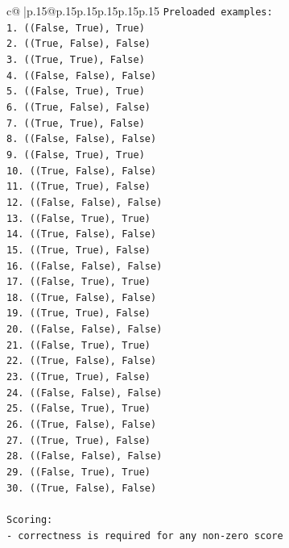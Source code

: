 \documentclass{article}
\begin{document}
{\begin{supertabular}{c@{$\;$}|p{.15\linewidth}@{}p{.15\linewidth}p{.15\linewidth}p{.15\linewidth}p{.15\linewidth}p{.15\linewidth}}
{{{\texttt{Preloaded examples:} \\
\texttt{1. ((False, True), True)} \\
\texttt{2. ((True, False), False)} \\
\texttt{3. ((True, True), False)} \\
\texttt{4. ((False, False), False)} \\
\texttt{5. ((False, True), True)} \\
\texttt{6. ((True, False), False)} \\
\texttt{7. ((True, True), False)} \\
\texttt{8. ((False, False), False)} \\
\texttt{9. ((False, True), True)} \\
\texttt{10. ((True, False), False)} \\
\texttt{11. ((True, True), False)} \\
\texttt{12. ((False, False), False)} \\
\texttt{13. ((False, True), True)} \\
\texttt{14. ((True, False), False)} \\
\texttt{15. ((True, True), False)} \\
\texttt{16. ((False, False), False)} \\
\texttt{17. ((False, True), True)} \\
\texttt{18. ((True, False), False)} \\
\texttt{19. ((True, True), False)} \\
\texttt{20. ((False, False), False)} \\
\texttt{21. ((False, True), True)} \\
\texttt{22. ((True, False), False)} \\
\texttt{23. ((True, True), False)} \\
\texttt{24. ((False, False), False)} \\
\texttt{25. ((False, True), True)} \\
\texttt{26. ((True, False), False)} \\
\texttt{27. ((True, True), False)} \\
\texttt{28. ((False, False), False)} \\
\texttt{29. ((False, True), True)} \\
\texttt{30. ((True, False), False)} \\
\\ 
\texttt{Scoring:} \\
\texttt{{-} correctness is required for any non{-}zero score} \\
}}}
\end{supertabular}}
\end{document}
